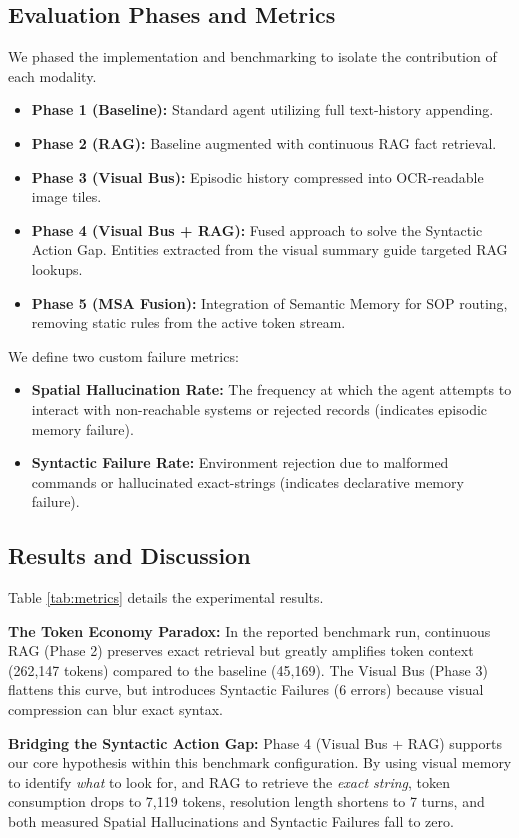 \documentclass[conference]{IEEEtran}
\begin{document}
\subsection{Evaluation Phases and Metrics}
We phased the implementation and benchmarking to isolate the contribution of each modality. 

\begin{itemize}
    \item \textbf{Phase 1 (Baseline):} Standard agent utilizing full text-history appending.
    \item \textbf{Phase 2 (RAG):} Baseline augmented with continuous RAG fact retrieval.
    \item \textbf{Phase 3 (Visual Bus):} Episodic history compressed into OCR-readable image tiles.
    \item \textbf{Phase 4 (Visual Bus + RAG):} Fused approach to solve the Syntactic Action Gap. Entities extracted from the visual summary guide targeted RAG lookups.
    \item \textbf{Phase 5 (MSA Fusion):} Integration of Semantic Memory for SOP routing, removing static rules from the active token stream.
\end{itemize}

We define two custom failure metrics:
\begin{itemize}
    \item \textbf{Spatial Hallucination Rate:} The frequency at which the agent attempts to interact with non-reachable systems or rejected records (indicates episodic memory failure).
    \item \textbf{Syntactic Failure Rate:} Environment rejection due to malformed commands or hallucinated exact-strings (indicates declarative memory failure).
\end{itemize}

\subsection{Results and Discussion}
Table \ref{tab:metrics} details the experimental results. 

\textbf{The Token Economy Paradox:} In the reported benchmark run, continuous RAG (Phase 2) preserves exact retrieval but greatly amplifies token context (262,147 tokens) compared to the baseline (45,169). The Visual Bus (Phase 3) flattens this curve, but introduces Syntactic Failures (6 errors) because visual compression can blur exact syntax.

\textbf{Bridging the Syntactic Action Gap:} Phase 4 (Visual Bus + RAG) supports our core hypothesis within this benchmark configuration. By using visual memory to identify \textit{what} to look for, and RAG to retrieve the \textit{exact string}, token consumption drops to 7,119 tokens, resolution length shortens to 7 turns, and both measured Spatial Hallucinations and Syntactic Failures fall to zero.
\end{document}
